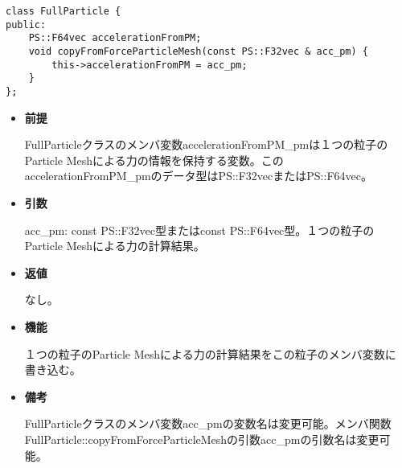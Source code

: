 
\begin{screen}
\begin{verbatim}
class FullParticle {
public:
    PS::F64vec accelerationFromPM;
    void copyFromForceParticleMesh(const PS::F32vec & acc_pm) {
        this->accelerationFromPM = acc_pm;
    }
};
\end{verbatim}
\end{screen}

\begin{itemize}

\item {\bf 前提}

  FullParticleクラスのメンバ変数accelerationFromPM\_pmは１つの粒子の
  Particle Meshによる力の情報を保持する変数。この
  accelerationFromPM\_pmのデータ型はPS::F32vecまたはPS::F64vec。

\item {\bf 引数}

  acc\_pm: const PS::F32vec型またはconst PS::F64vec型。１つの粒子の
  Particle Meshによる力の計算結果。

\item {\bf 返値}

  なし。
  
\item {\bf 機能}

  １つの粒子のParticle Meshによる力の計算結果をこの粒子のメンバ変数に
  書き込む。
  
\item {\bf 備考}

  FullParticleクラスのメンバ変数acc\_pmの変数名は変更可能。メンバ関数
  FullParticle::copyFromForceParticleMeshの引数acc\_pmの引数名は変更可
  能。

\end{itemize}
